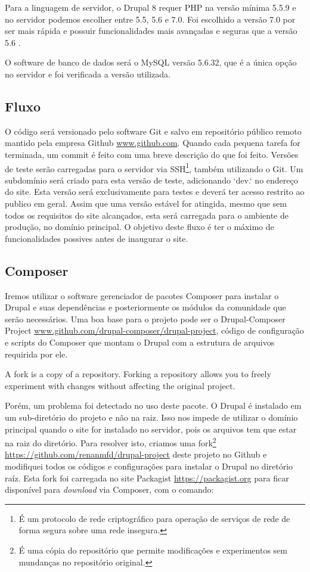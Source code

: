 Para a linguagem de servidor, o Drupal 8 requer PHP na versão mínima 5.5.9 e no servidor podemos escolher entre 5.5, 5.6 e 7.0. Foi escolhido a versão 7.0 por ser mais rápida \cite{PHP7Velocidade} e possuir funcionalidades mais avançadas e seguras que a versão 5.6 \cite{PHP7}.

O software de banco de dados será o MySQL versão 5.6.32, que é a única opção no servidor e foi verificada a versão utilizada.

\subsection{Fluxo}
O código será versionado pelo software Git e salvo em repositório público remoto mantido pela empresa Github \url{www.github.com}. Quando cada pequena tarefa for terminada, um commit é feito com uma breve descrição do que foi feito. Versões de teste serão carregadas para o servidor via SSH\footnote{É um protocolo de rede criptográfico para operação de serviços de rede de forma segura sobre uma rede insegura\cite{SSH}.}, também utilizando o Git. Um subdomínio será criado para esta versão de teste, adicionando `dev.` no endereço do site. Esta versão será exclusivamente para testes e deverá ter acesso restrito ao publico em geral. Assim que uma versão estável for atingida, mesmo que sem todos os requisitos do site alcançados, esta será carregada para o ambiente de produção, no domínio principal. O objetivo deste fluxo é ter o máximo de funcionalidades possives antes de inaugurar o site.

\subsection{Composer}
Iremos utilizar o software gerenciador de pacotes Composer para instalar o Drupal e suas dependências e posteriormente os módulos da comunidade que serão necessários. Uma boa base para o projeto pode ser o Drupal-Composer Project \url{www.github.com/drupal-composer/drupal-project}, código de configuração e scripts do Composer que montam o Drupal com a estrutura de arquivos requirida por ele.

A fork is a copy of a repository. Forking a repository allows you to freely experiment with changes without affecting the original project.

Porém, um problema foi detectado no uso deste pacote. O Drupal é instalado em um sub-diretório do projeto e não na raiz. Isso nos impede de utilizar o domínio principal quando o site for instalado no servidor, pois os arquivos tem que estar na raiz do diretório. Para resolver isto, criamos uma fork\footnote{É uma cópia do repositório que permite modificações e experimentos sem mundanças no repositório original.} \url{https://github.com/renanmfd/drupal-project} deste projeto no Github e modifiquei todos os códigos e configurações para instalar o Drupal no diretório raíz. Esta fork foi carregada no site Packagist \url{https://packagist.org} para ficar disponível para \textit{download} via Composer, com o comando:


